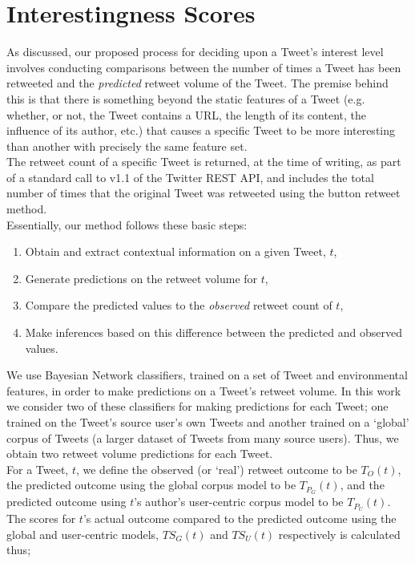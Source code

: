 \section{Interestingness Scores}
As discussed, our proposed process for deciding upon a Tweet's interest level involves conducting comparisons between the number of times a Tweet has been retweeted and the \textit{predicted} retweet volume of the Tweet. The premise behind this is that there is something beyond the static features of a Tweet (e.g. whether, or not, the Tweet contains a URL, the length of its content, the influence of its author, etc.) that causes a specific Tweet to be more interesting than another with precisely the same feature set.\\
The retweet count of a specific Tweet is returned, at the time of writing, as part of a standard call to v1.1 of the Twitter REST API, and includes the total number of times that the original Tweet was retweeted using the button retweet method.\\
Essentially, our method follows these basic steps:
\begin{enumerate}
\item Obtain and extract contextual information on a given Tweet, $t$,
\item Generate predictions on the retweet volume for $t$,
\item Compare the predicted values to the \textit{observed} retweet count of $t$,
\item Make inferences based on this difference between the predicted and observed values.
\end{enumerate}
We use Bayesian Network classifiers, trained on a set of Tweet and environmental features, in order to make predictions on a Tweet's retweet volume. In this work we consider two of these classifiers for making predictions for each Tweet; one trained on the Tweet's source user's own Tweets and another trained on a `global' corpus of Tweets (a larger dataset of Tweets from many source users). Thus, we obtain two retweet volume predictions for each Tweet.\\
For a Tweet, $ t $, we define the observed (or `real') retweet outcome to be $ T_O(t) $, the predicted outcome using the global corpus model to be $ T_{P_G}(t) $, and the predicted outcome using $t$'s author's user-centric corpus model to be $ T_{P_U}(t) $. The scores for $t$'s actual outcome compared to the predicted outcome using the global and user-centric models, $ TS_G(t) $ and $ TS_U(t) $ respectively is calculated thus;

